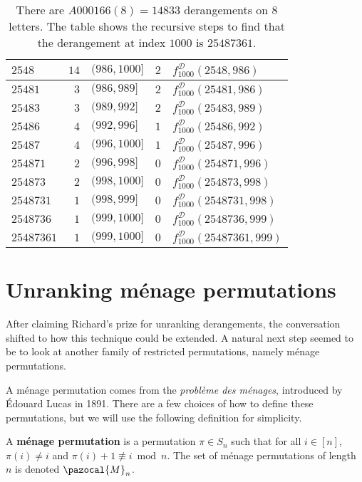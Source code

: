 \begin{table}
\begin{tabular}{|l|r|l|c|l|}
  $2548    $ & $14$   & $(986, 1000]$     & $2$ & $f^{\mathcal{D}}_{1000}(2548, 986)$     \\
  \hline
  $25481   $ & $3$    & $(986, 989]$      & $2$ & $f^{\mathcal{D}}_{1000}(25481, 986)$    \\
  $25483   $ & $3$    & $(989, 992]$      & $2$ & $f^{\mathcal{D}}_{1000}(25483, 989)$    \\
  $25486   $ & $4$    & $(992, 996]$      & $1$ & $f^{\mathcal{D}}_{1000}(25486, 992)$    \\
  $25487   $ & $4$    & $(996, 1000]$     & $1$ & $f^{\mathcal{D}}_{1000}(25487, 996)$    \\
  \hline
  $254871   $ & $2$   & $(996, 998]$      & $0$ & $f^{\mathcal{D}}_{1000}(254871, 996)$   \\
  $254873   $ & $2$   & $(998, 1000]$     & $0$ & $f^{\mathcal{D}}_{1000}(254873, 998)$   \\
  \hline
  $2548731  $ & $1$   & $(998, 999]$      & $0$ & $f^{\mathcal{D}}_{1000}(2548731, 998)$  \\
  $2548736  $ & $1$   & $(999, 1000]$     & $0$ & $f^{\mathcal{D}}_{1000}(2548736, 999)$  \\
  \hline
  $25487361 $ & $1$   & $(999, 1000]$     & $0$ & $f^{\mathcal{D}}_{1000}(25487361, 999)$ \\
  \hline
\end{tabular}
\caption[Steps for computing the $1000$th derangement in $S_8$]{
  There are $A000166(8) = 14833$ derangements on $8$ letters.
  The table shows the recursive steps to find that the derangement at index
  $1000$ is $25487361$.
}
\label{table:unrankDerangement}
\end{table}

\section{Unranking m\'enage permutations}
\label{sec:unrankingMenage}
After claiming Richard's prize for unranking derangements, the conversation shifted to
how this technique could be extended. A natural next step seemed to be to look
at another family of restricted permutations, namely m\'enage permutations.

A m\'enage permutation comes from the \textit{probl\`eme des m\'enages},
introduced by \'Edouard Lucas in 1891.
There are a few choices of how to define these permutations, but we will
use the following definition for simplicity.
\begin{definition}
  A \textbf{m\'enage permutation} is a permutation $\pi \in S_n$ such that for
  all $i \in [n]$,
  $\pi(i) \neq i$ and
  $\pi(i) + 1 \not\equiv i \bmod n$.
  The set of m\'enage permutations of length $n$ is denoted $\pazocal{M}_n$.
\end{definition}

